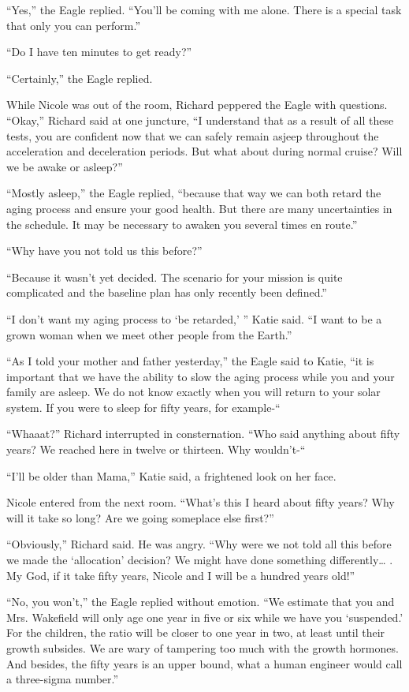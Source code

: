 \documentclass[]{article}
\begin{document}
{“Yes,” the Eagle replied. “You’ll be coming with me alone. There is a special task that only you can perform.”

“Do I have ten minutes to get ready?”

“Certainly,” the Eagle replied.

While Nicole was out of the room, Richard peppered the Eagle with questions. “Okay,” Richard said at one juncture, “I understand that as a result of all these tests, you are confident now that we can safely remain asjeep throughout the acceleration and deceleration periods. But what about during normal cruise? Will we be awake or asleep?”

“Mostly asleep,” the Eagle replied, “because that way we can both retard the aging process and ensure your good health. But there are many uncertainties in the schedule. It may be necessary to awaken you several times en route.”

“Why have you not told us this before?”

“Because it wasn’t yet decided. The scenario for your mission is quite complicated and the baseline plan has only recently been defined.”

“I don’t want my aging process to ‘be retarded,’ ” Katie said. “I want to be a grown woman when we meet other people from the Earth.”

“As I told your mother and father yesterday,” the Eagle said to Katie, “it is important that we have the ability to slow the aging process while you and your family are asleep. We do not know exactly when you will return to your solar system. If you were to sleep for fifty years, for example-“

“Whaaat?” Richard interrupted in consternation. “Who said anything about fifty years? We reached here in twelve or thirteen. Why wouldn’t-“

“I’ll be older than Mama,” Katie said, a frightened look on her face.

Nicole entered from the next room. “What’s this I heard about fifty years? Why will it take so long? Are we going someplace else first?”

“Obviously,” Richard said. He was angry. “Why were we not told all this before we made the ‘allocation’ decision? We might have done something differently… . My God, if it take fifty years, Nicole and I will be a hundred years old!”

“No, you won’t,” the Eagle replied without emotion. “We estimate that you and Mrs. Wakefield will only age one year in five or six while we have you ‘suspended.’ For the children, the ratio will be closer to one year in two, at least until their growth subsides. We are wary of tampering too much with the growth hormones. And besides, the fifty years is an upper bound, what a human engineer would call a three-sigma number.”

}
\end{document}
